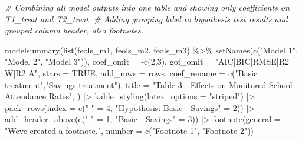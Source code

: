 \documentclass[
]{article}
\newenvironment{Shaded}{\begin{snugshade}}{\end{snugshade}}
\newcommand{\AttributeTok}[1]{\textcolor[rgb]{0.77,0.63,0.00}{#1}}
\newcommand{\CommentTok}[1]{\textcolor[rgb]{0.56,0.35,0.01}{\textit{#1}}}
\newcommand{\ConstantTok}[1]{\textcolor[rgb]{0.00,0.00,0.00}{#1}}
\newcommand{\DecValTok}[1]{\textcolor[rgb]{0.00,0.00,0.81}{#1}}
\newcommand{\FunctionTok}[1]{\textcolor[rgb]{0.00,0.00,0.00}{#1}}
\newcommand{\NormalTok}[1]{#1}
\newcommand{\OtherTok}[1]{\textcolor[rgb]{0.56,0.35,0.01}{#1}}
\newcommand{\SpecialCharTok}[1]{\textcolor[rgb]{0.00,0.00,0.00}{#1}}
\newcommand{\StringTok}[1]{\textcolor[rgb]{0.31,0.60,0.02}{#1}}
\begin{document}
\begin{Shaded}
\begin{Highlighting}[]
\CommentTok{\# Combining all model outputs into one table and showing only coefficients on T1\_treat and T2\_treat.}
\CommentTok{\# Adding grouping label to hypothesis test results and grouped column header, also footnotes.}

\FunctionTok{modelsummary}\NormalTok{(}\FunctionTok{list}\NormalTok{(feols\_m1, feols\_m2, feols\_m3) }\SpecialCharTok{\%\textgreater{}\%}
               \FunctionTok{setNames}\NormalTok{(}\FunctionTok{c}\NormalTok{(}\StringTok{"Model 1"}\NormalTok{, }\StringTok{"Model 2"}\NormalTok{, }\StringTok{"Model 3"}\NormalTok{)),}
             \AttributeTok{coef\_omit =} \SpecialCharTok{{-}}\FunctionTok{c}\NormalTok{(}\DecValTok{2}\NormalTok{,}\DecValTok{3}\NormalTok{),}
             \AttributeTok{gof\_omit =} \StringTok{"AIC|BIC|RMSE|R2 W|R2 A"}\NormalTok{,}
             \AttributeTok{stars =} \ConstantTok{TRUE}\NormalTok{,}
             \AttributeTok{add\_rows =}\NormalTok{ rows,}
             \AttributeTok{coef\_rename =} \FunctionTok{c}\NormalTok{(}\StringTok{"Basic treatment"}\NormalTok{,}\StringTok{"Savings treatment"}\NormalTok{),}
             \AttributeTok{title =} \StringTok{"Table 3 {-} Effects on Monitored School Attendance Rates"}\NormalTok{,}
\NormalTok{             ) }\SpecialCharTok{|\textgreater{}}
             \FunctionTok{kable\_styling}\NormalTok{(}\AttributeTok{latex\_options =} \StringTok{"striped"}\NormalTok{) }\SpecialCharTok{|\textgreater{}} \FunctionTok{pack\_rows}\NormalTok{(}\AttributeTok{index =} \FunctionTok{c}\NormalTok{(}\StringTok{" "} \OtherTok{=} \DecValTok{4}\NormalTok{, }\StringTok{"Hypothesis: Basic {-} Savings"} \OtherTok{=} \DecValTok{2}\NormalTok{)) }\SpecialCharTok{|\textgreater{}}
                                                        \FunctionTok{add\_header\_above}\NormalTok{(}\FunctionTok{c}\NormalTok{(}\StringTok{" "} \OtherTok{=} \DecValTok{1}\NormalTok{, }\StringTok{"Basic {-} Savings"} \OtherTok{=} \DecValTok{3}\NormalTok{)) }\SpecialCharTok{|\textgreater{}}
                                                                           \FunctionTok{footnote}\NormalTok{(}\AttributeTok{general =} \StringTok{"We\textquotesingle{}ve created a footnote."}\NormalTok{,}
                                                                                    \AttributeTok{number =} \FunctionTok{c}\NormalTok{(}\StringTok{"Footnote 1"}\NormalTok{, }\StringTok{"Footnote 2"}\NormalTok{))}
\end{Highlighting}
\end{Shaded}
\end{document}
